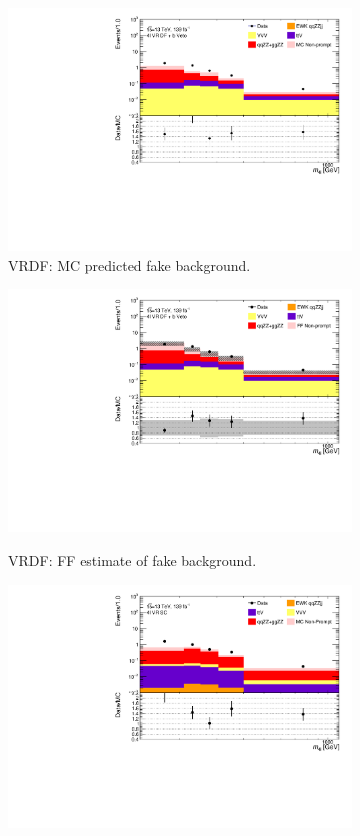 \begin{figure}[!htb]
    \centering
    \begin{subfigure}{.48\textwidth}
        \centering
        \includegraphics[width = 0.85\linewidth]{figures/Analysis/Background/Overlay_VRDF_RedMC_M4l.pdf}
        \caption{VRDF: MC predicted fake background.\label{subfig:VRDFMCRed}}
    \end{subfigure}
    \begin{subfigure}{.48\textwidth}
        \centering
        \includegraphics[width = 0.85\linewidth]{figures/Analysis/Background/Overlay_VRDF_FFApplied_M4l.pdf}\\
        \caption{ VRDF: FF estimate of fake background. \label{subfig:VRDFFF} }
    \end{subfigure}
    \begin{subfigure}{.48\textwidth}
        \centering
        \includegraphics[width = 0.85\linewidth]{figures/Analysis/Background/Overlay_VRSC_RedMC_M4l.pdf}

\end{subfigure}
\end{figure}
